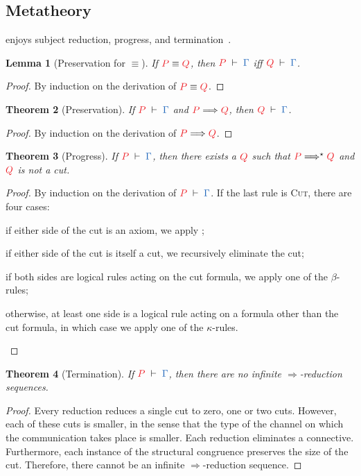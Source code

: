 \documentclass[submission,copyright,creativecommons]{eptcs}
\newtheorem{lemma}{Lemma}[section]
\newtheorem{theorem}[lemma]{Theorem}
\begin{document}
\subsection{Metatheory}
\cp enjoys subject reduction, progress, and termination~\citep{wadler2012}.
\begin{lemma}[Preservation for $\equiv$]\label{lem:cp-preservation-equiv}
  If $\tm{P}\equiv\tm{Q}$, then $\seq[P]{\Gamma}$ iff $\seq[Q]{\Gamma}$.
\end{lemma}\vspace*{-0.75\baselineskip}%
\begin{proof}
  By induction on the derivation of $\tm{P}\equiv\tm{Q}$.
\end{proof}
\begin{theorem}[Preservation]\label{thm:cp-preservation}
  If $\seq[P]{\Gamma}$ and $\reducesto{P}{Q}$, then $\seq[Q]{\Gamma}$.
\end{theorem}\vspace*{-0.75\baselineskip}%
\begin{proof}
  By induction on the derivation of $\reducesto{P}{Q}$.
\end{proof}%
\begin{theorem}[Progress]\label{thm:cp-progress}
  If $\seq[P]{\Gamma}$, then there exists a $\tm{Q}$ such that
  $\tm{P}\Longrightarrow^\star\tm{Q}$ and $\tm{Q}$ is not a cut.
\end{theorem}\vspace*{-0.75\baselineskip}%
\begin{proof}
  By induction on the derivation of $\seq[P]{\Gamma}$. If the last rule is \textsc{Cut}, there are four cases:
  \begin{enumerate*}[label={\alph*)}]
  \item
    if either side of the cut is an axiom, we apply ;
  \item
    if either side of the cut is itself a cut, we recursively eliminate the cut;
  \item
    if both sides are logical rules acting on the cut formula, we apply
    one of the $\beta$-rules;
  \item
    otherwise, at least one side is a logical rule acting on a formula other
    than the cut formula, in which case we apply one of the $\kappa$-rules.
  \end{enumerate*}
\end{proof}%
\begin{theorem}[Termination]\label{thm:cp-termination}
  If $\seq[P]{\Gamma}$, then there are no infinite $\Longrightarrow$-reduction sequences.
\end{theorem}\vspace*{-0.75\baselineskip}%
\begin{proof}
  Every reduction reduces a single cut to zero, one or two cuts. However, each of these cuts is smaller, in the sense that the type of the channel on which the communication takes place is smaller. Each reduction eliminates a connective. Furthermore, each instance of the structural congruence preserves the size of the cut. Therefore, there cannot be an infinite $\Longrightarrow$-reduction sequence.
\end{proof}
\end{document}
